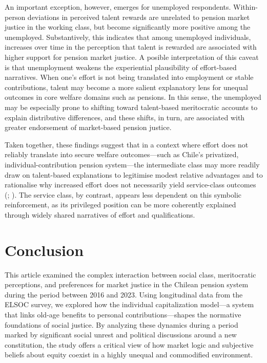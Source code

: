 \documentclass[
  12pt,
]{article}
\begin{document}
An important exception, however, emerges for unemployed respondents.
Within-person deviations in perceived talent rewards are unrelated to
pension market justice in the working class, but become significantly
more positive among the unemployed. Substantively, this indicates that
among unemployed individuals, increases over time in the perception that
talent is rewarded are associated with higher support for pension market
justice. A posible interpretation of this caveat is that unemployment
weakens the experiential plausibility of effort-based narratives. When
one's effort is not being translated into employment or stable
contributions, talent may become a more salient explanatory lens for
unequal outcomes in core welfare domains such as pensions. In this
sense, the unemployed may be especially prone to shifting toward
talent-based meritocratic accounts to explain distributive differences,
and these shifts, in turn, are associated with greater endorsement of
market-based pension justice.

Taken together, these findings suggest that in a context where effort
does not reliably translate into secure welfare outcomes---such as
Chile's privatized, individual-contribution pension system---the
intermediate class may more readily draw on talent-based explanations to
legitimise modest relative advantages and to rationalise why increased
effort does not necessarily yield service-class outcomes
(;
). The service
class, by contrast, appears less dependent on this symbolic
reinforcement, as its privileged position can be more coherently
explained through widely shared narratives of effort and qualifications.

\section{Conclusion}\label{conclusion}

This article examined the complex interaction between social class,
meritocratic perceptions, and preferences for market justice in the
Chilean pension system during the period between 2016 and 2023. Using
longitudinal data from the ELSOC survey, we explored how the individual
capitalization model---a system that links old-age benefits to personal
contributions---shapes the normative foundations of social justice. By
analyzing these dynamics during a period marked by significant social
unrest and political discussions around a new constitution, the study
offers a critical view of how market logic and subjective beliefs about
equity coexist in a highly unequal and commodified environment.
\end{document}
